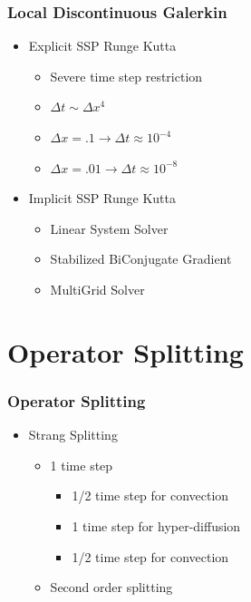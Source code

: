 \documentclass[10pt]{beamer}
\begin{document}
    \begin{frame}
      \frametitle{Local Discontinuous Galerkin}
      \begin{itemize}
        \item Explicit SSP Runge Kutta
          \begin{itemize}
            \item Severe time step restriction
            \item $\Delta t \sim \Delta x^4$
            \item $\Delta x = .1 \to \Delta t \approx 10^{-4}$
            \item $\Delta x = .01 \to \Delta t \approx 10^{-8}$
          \end{itemize}

        \item Implicit SSP Runge Kutta
          \begin{itemize}
            \item Linear System Solver
            \item Stabilized BiConjugate Gradient
            \item MultiGrid Solver
          \end{itemize}
      \end{itemize}
    \end{frame}

  \section{Operator Splitting}
    \begin{frame}
      \frametitle{Operator Splitting}
      \begin{itemize}
        \item Strang Splitting
          \begin{itemize}
            \item 1 time step
              \begin{itemize}
                \item 1/2 time step for convection
                \item 1 time step for hyper-diffusion
                \item 1/2 time step for convection
              \end{itemize}
            \item Second order splitting
          \end{itemize}
      \end{itemize}
    \end{frame}
\end{document}
